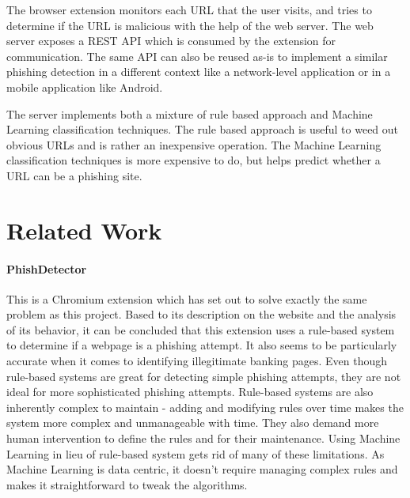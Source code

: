 \documentclass[conference]{IEEEtran}
\begin{document}
\par The browser extension monitors each URL that the user visits, and tries to determine if the URL is malicious with the help of the web server.
The web server exposes a REST API which is consumed by the extension for communication.
The same API can also be reused as-is to implement a similar phishing detection in a different context like a network-level application or in a mobile application like Android.

\par The server implements both a mixture of rule based approach and Machine Learning classification techniques. The rule based approach is useful to weed out obvious URLs and is rather an inexpensive operation. The Machine Learning classification techniques is more expensive to do, but helps predict whether a URL can be a phishing site.

\section{Related Work}
\paragraph{PhishDetector\cite{PhishDetector}}
This is a Chromium extension which has set out to solve exactly the same problem as this project.
Based to its description on the website and the analysis of its behavior, it can be concluded that this extension uses a rule-based system to determine if a webpage is a phishing attempt.
It also seems to be particularly accurate when it comes to identifying illegitimate banking pages.
Even though rule-based systems are great for detecting simple phishing attempts, they are not ideal for more sophisticated phishing attempts.
Rule-based systems are also inherently complex to maintain - adding and modifying rules over time makes the system more complex and unmanageable with time.
They also demand more human intervention to define the rules and for their maintenance.
Using Machine Learning in lieu of rule-based system gets rid of many of these limitations.
As Machine Learning is data centric, it doesn't require managing complex rules and makes it straightforward to tweak the algorithms.
\end{document}

